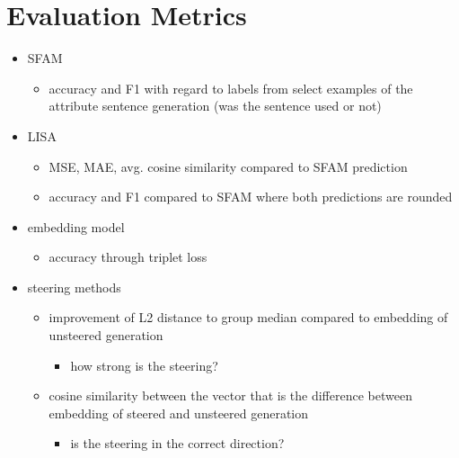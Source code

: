 \section{Evaluation Metrics}
\label{sec:approach:evaluationMetrics}

\begin{itemize}
  \item SFAM
        \begin{itemize}
          \item accuracy and F1 with regard to labels from select examples of the attribute sentence generation (was the sentence used or not)
        \end{itemize}
  \item LISA
        \begin{itemize}
          \item MSE, MAE, avg. cosine similarity compared to SFAM prediction
          \item accuracy and F1 compared to SFAM where both predictions are rounded
        \end{itemize}
  \item embedding model
        \begin{itemize}
          \item accuracy through triplet loss
        \end{itemize}
  \item steering methods
        \begin{itemize}
          \item improvement of L2 distance to group median compared to embedding of unsteered generation
                \begin{itemize}
                  \item how strong is the steering?
                \end{itemize}
          \item cosine similarity between the vector that is the difference between embedding of steered and unsteered generation
                \begin{itemize}
                  \item is the steering in the correct direction?
                \end{itemize}
        \end{itemize}
\end{itemize}


